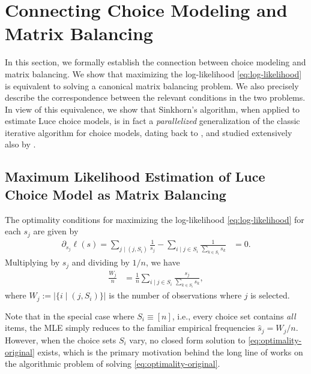 \section{Connecting Choice Modeling and Matrix Balancing}
\label{sec:equivalence}

In this section, we formally establish the connection between choice modeling and matrix balancing. We show that
maximizing the log-likelihood \eqref{eq:log-likelihood} is equivalent to solving a canonical matrix balancing problem. We also precisely describe the correspondence between the relevant conditions in the two problems. In view of this equivalence, we show that Sinkhorn's algorithm, when applied to estimate Luce choice models, is in fact a \emph{parallelized} generalization of the classic iterative algorithm for choice models, dating back to \citet{zermelo1929berechnung,dykstra1956note,ford1957solution}, and studied extensively also by \citet{hunter2004mm,vojnovic2020convergence}.

\subsection{Maximum Likelihood Estimation of Luce Choice Model as Matrix Balancing}
\label{subsec:reformulation}
The optimality conditions for maximizing the log-likelihood \eqref{eq:log-likelihood} for each $s_j$ are given by
\begin{align*}
\partial_{s_{j}}\ell(s)=\sum_{j\mid (j,S_i)}\frac{1}{s_{j}}-\sum_{i\mid j\in S_{i}}\frac{1}{\sum_{k\in S_{i}}s_{k}} & =0.
\end{align*}
 Multiplying by $s_{j}$ and dividing by $1/n$, we have 
\begin{align}
\label{eq:optimality-original}
\frac{W_j}{n} & = \frac{1}{n} \sum_{i\mid j\in S_{i}}\frac{s_{j}}{\sum_{k\in S_{i}}s_{k}},
\end{align}
where $W_j:=|\{i\mid (j,S_i)\}|$ is the number of observations where $j$ is selected.

Note that in the special case where $S_i\equiv [n]$, i.e., every choice set contains \emph{all} items, the MLE simply reduces to the familiar empirical frequencies $\hat s_j = {W_j}/{n}$. However, when the choice sets $S_i$ vary, no closed form solution to \eqref{eq:optimality-original} exists, which is the primary motivation behind the long line of works on the algorithmic problem of solving \eqref{eq:optimality-original}. 

